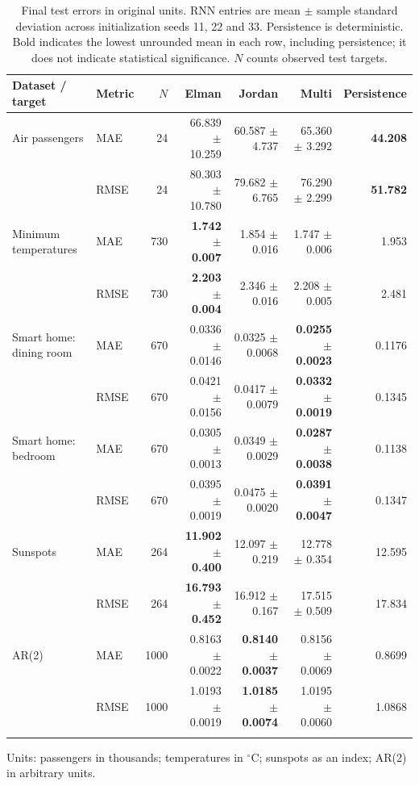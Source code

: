 \begin{table}[t]
\centering
\small
\caption{Final test errors in original units. RNN entries are mean $\pm$ sample standard deviation across initialization seeds 11, 22 and 33. Persistence is deterministic. Bold indicates the lowest unrounded mean in each row, including persistence; it does not indicate statistical significance. $N$ counts observed test targets.}
\label{tab:final-errors}
\begin{tabular}{llrrrrr}
\toprule
Dataset / target & Metric & $N$ & Elman & Jordan & Multi & Persistence \\
\midrule
Air passengers & MAE & 24 & 66.839 $\pm$ 10.259 & 60.587 $\pm$ 4.737 & 65.360 $\pm$ 3.292 & \textbf{44.208} \\
 & RMSE & 24 & 80.303 $\pm$ 10.780 & 79.682 $\pm$ 6.765 & 76.290 $\pm$ 2.299 & \textbf{51.782} \\
\addlinespace
Minimum temperatures & MAE & 730 & \textbf{1.742 $\pm$ 0.007} & 1.854 $\pm$ 0.016 & 1.747 $\pm$ 0.006 & 1.953 \\
 & RMSE & 730 & \textbf{2.203 $\pm$ 0.004} & 2.346 $\pm$ 0.016 & 2.208 $\pm$ 0.005 & 2.481 \\
\addlinespace
Smart home: dining room & MAE & 670 & 0.0336 $\pm$ 0.0146 & 0.0325 $\pm$ 0.0068 & \textbf{0.0255 $\pm$ 0.0023} & 0.1176 \\
 & RMSE & 670 & 0.0421 $\pm$ 0.0156 & 0.0417 $\pm$ 0.0079 & \textbf{0.0332 $\pm$ 0.0019} & 0.1345 \\
\addlinespace
Smart home: bedroom & MAE & 670 & 0.0305 $\pm$ 0.0013 & 0.0349 $\pm$ 0.0029 & \textbf{0.0287 $\pm$ 0.0038} & 0.1138 \\
 & RMSE & 670 & 0.0395 $\pm$ 0.0019 & 0.0475 $\pm$ 0.0020 & \textbf{0.0391 $\pm$ 0.0047} & 0.1347 \\
\addlinespace
Sunspots & MAE & 264 & \textbf{11.902 $\pm$ 0.400} & 12.097 $\pm$ 0.219 & 12.778 $\pm$ 0.354 & 12.595 \\
 & RMSE & 264 & \textbf{16.793 $\pm$ 0.452} & 16.912 $\pm$ 0.167 & 17.515 $\pm$ 0.509 & 17.834 \\
\addlinespace
AR(2) & MAE & 1000 & 0.8163 $\pm$ 0.0022 & \textbf{0.8140 $\pm$ 0.0037} & 0.8156 $\pm$ 0.0069 & 0.8699 \\
 & RMSE & 1000 & 1.0193 $\pm$ 0.0019 & \textbf{1.0185 $\pm$ 0.0074} & 1.0195 $\pm$ 0.0060 & 1.0868 \\
\addlinespace
\bottomrule
\end{tabular}
\par\smallskip\footnotesize Units: passengers in thousands; temperatures in $^\circ$C; sunspots as an index; AR(2) in arbitrary units.
\end{table}
